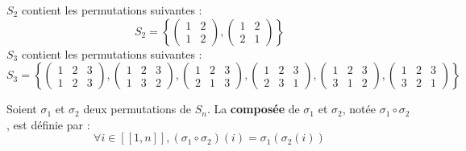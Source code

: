 \documentclass[12pt, a4paper]{report}
\begin{document}
\begin{example}
    $S_2$ contient les permutations suivantes :
    \[
        S_2 = \left\{\left(\begin{matrix} 1 & 2 \\ 1 & 2 \end{matrix}\right), \left(\begin{matrix} 1 & 2 \\ 2 & 1 \end{matrix}\right)\right\}
    \]
    $S_3$ contient les permutations suivantes :
    \[
        S_3 = \left\{\left(\begin{matrix} 1 & 2 & 3 \\ 1 & 2 & 3 \end{matrix}\right), \left(\begin{matrix} 1 & 2 & 3 \\ 1 & 3 & 2 \end{matrix}\right), \left(\begin{matrix} 1 & 2 & 3 \\ 2 & 1 & 3 \end{matrix}\right), \left(\begin{matrix} 1 & 2 & 3 \\ 2 & 3 & 1 \end{matrix}\right), \left(\begin{matrix} 1 & 2 & 3 \\ 3 & 1 & 2 \end{matrix}\right), \left(\begin{matrix} 1 & 2 & 3 \\ 3 & 2 & 1 \end{matrix}\right)\right\}
    \]
\end{example}

\begin{definition}
    Soient $\sigma_1$ et $\sigma_2$ deux permutations de $S_n$. La \textbf{composée} de $\sigma_1$ et $\sigma_2$, notée $\sigma_1 \circ \sigma_2$, est définie par :
    $$\forall i \in [\![1,n]\!], (\sigma_1 \circ \sigma_2)(i) = \sigma_1(\sigma_2(i))$$
\end{definition}
\end{document}
